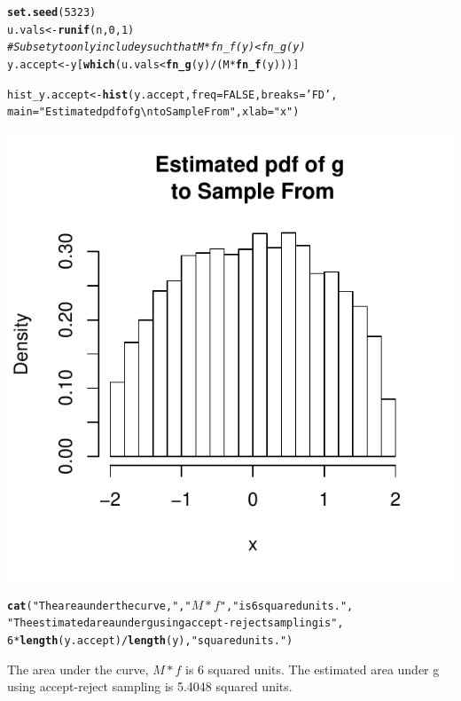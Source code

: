 \documentclass{article}\usepackage[]{graphicx}\usepackage[]{color}
\makeatletter
\def\maxwidth{ %
  \ifdim\Gin@nat@width>\linewidth
    \linewidth
  \else
    \Gin@nat@width
  \fi
}
\newcommand{\hlnum}[1]{\textcolor[rgb]{0.686,0.059,0.569}{#1}}%
\newcommand{\hlstr}[1]{\textcolor[rgb]{0.192,0.494,0.8}{#1}}%
\newcommand{\hlcom}[1]{\textcolor[rgb]{0.678,0.584,0.686}{\textit{#1}}}%
\newcommand{\hlopt}[1]{\textcolor[rgb]{0,0,0}{#1}}%
\newcommand{\hlstd}[1]{\textcolor[rgb]{0.345,0.345,0.345}{#1}}%
\newcommand{\hlkwb}[1]{\textcolor[rgb]{0.69,0.353,0.396}{#1}}%
\newcommand{\hlkwc}[1]{\textcolor[rgb]{0.333,0.667,0.333}{#1}}%
\newcommand{\hlkwd}[1]{\textcolor[rgb]{0.737,0.353,0.396}{\textbf{#1}}}%
\newenvironment{kframe}{%
 \def\at@end@of@kframe{}%
 \ifinner\ifhmode%
  \def\at@end@of@kframe{\end{minipage}}%
  \begin{minipage}{\columnwidth}%
 \fi\fi%
 \def\FrameCommand##1{\hskip\@totalleftmargin \hskip-\fboxsep
 \colorbox{shadecolor}{##1}\hskip-\fboxsep
     \hskip-\linewidth \hskip-\@totalleftmargin \hskip\columnwidth}%
 \MakeFramed {\advance\hsize-\width
   \@totalleftmargin\z@ \linewidth\hsize
   \@setminipage}}%
 {\par\unskip\endMakeFramed%
 \at@end@of@kframe}
\makeatother
\begin{document}
\begin{enumerate}
\begin{kframe}
\begin{alltt}
\hlkwd{set.seed}\hlstd{(}\hlnum{5323}\hlstd{)}
\hlstd{u.vals} \hlkwb{<-} \hlkwd{runif}\hlstd{(n,}\hlnum{0}\hlstd{,}\hlnum{1}\hlstd{)}
\hlcom{# Subset y to only include y such that M*fn_f(y) < fn_g(y)}
\hlstd{y.accept} \hlkwb{<-} \hlstd{y[}\hlkwd{which}\hlstd{(u.vals} \hlopt{<} \hlkwd{fn_g}\hlstd{(y)}\hlopt{/}\hlstd{(M}\hlopt{*}\hlkwd{fn_f}\hlstd{(y)))]}

\hlstd{hist_y.accept} \hlkwb{<-} \hlkwd{hist}\hlstd{(y.accept,} \hlkwc{freq} \hlstd{=} \hlnum{FALSE}\hlstd{,} \hlkwc{breaks} \hlstd{=} \hlstr{'FD'}\hlstd{,}
      \hlkwc{main} \hlstd{=} \hlstr{"Estimated pdf of g \textbackslash{}n to Sample From "}\hlstd{,} \hlkwc{xlab} \hlstd{=} \hlstr{"x"}\hlstd{)}
\end{alltt}
\end{kframe}

{\centering \includegraphics[width=\maxwidth]{figure/prob5-3} 

}


\begin{kframe}\begin{alltt}
\hlkwd{cat}\hlstd{(}\hlstr{"The area under the curve,"}\hlstd{,} \hlstr{"$M*f$"}\hlstd{,} \hlstr{"is 6 squared units."}\hlstd{,}
    \hlstr{"The estimated area under g using accept-reject sampling is"}\hlstd{,}
    \hlnum{6}\hlopt{*}\hlkwd{length}\hlstd{(y.accept)}\hlopt{/}\hlkwd{length}\hlstd{(y),} \hlstr{"squared units."}\hlstd{)}
\end{alltt}
\end{kframe}The area under the curve, $M*f$ is 6 squared units. The estimated area under g using accept-reject sampling is 5.4048 squared units.


\end{enumerate}
\end{document}
